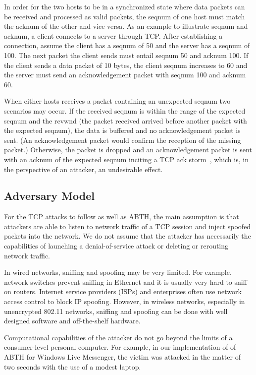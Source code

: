 \documentclass{sig-alternate}
\begin{document}
In order for the two hosts to be in a synchronized state where data packets can be received and processed as valid packets, the seqnum of one host must match the acknum of the other and vice versa. 
As an example to illustrate seqnum and acknum, a client connects to a server through TCP.
After establishing a connection, assume the client has a seqnum of 50 and the server has a seqnum of 100.
The next packet the client sends must entail seqnum 50 and acknum 100.
If the client sends a data packet of 10 bytes, the client seqnum increases to 60 and the server must send an acknowledgement packet with seqnum 100 and acknum 60.

When either hosts receives a packet containing an unexpected seqnum two scenarios may occur.
If the received seqnum is within the range of the expected seqnum and the rcvwnd (the packet received arrived before another packet with the expected seqnum), the data is buffered and no acknowledgement packet is sent.
(An acknowledgement packet would confirm the reception of the missing packet.)
Otherwise, the packet is dropped and an acknowledgement packet is sent with an acknum of the expected seqnum inciting a TCP ack storm~\cite{anderson:ackstorm}, which is, in the perspective of an attacker, an undesirable effect.

\subsection{Adversary Model}
\label{sec:adversarymodel}

For the TCP attacks to follow as well as ABTH, the main assumption is that attackers are able to listen to network traffic of a TCP session and inject spoofed packets into the network.
We do not assume that the attacker has necessarily the capabilities of launching a denial-of-service attack or deleting or rerouting network traffic.

In wired networks, sniffing and spoofing may be very limited.
For example, network switches prevent sniffing in Ethernet and it is usually very hard to sniff on routers.
Internet service providers (ISPs) and enterprises often use network access control to block IP spoofing.
However, in wireless networks, especially in unencrypted 802.11 networks, sniffing and spoofing can be done with well designed software and off-the-shelf hardware.

Computational capabilities of the attacker do not go beyond the limits of a consumer-level personal computer.
For example, in our implementation of of ABTH for Windows Live Messenger, the victim was attacked in the matter of two seconds with the use of a modest laptop.
\end{document}
